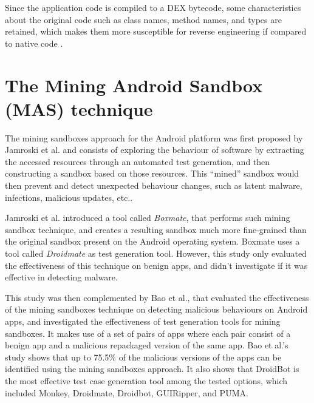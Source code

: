 Since the application code is compiled to a DEX bytecode, some characteristics about the original code such as class names, method names, and types are retained, which makes them more susceptible for reverse engineering if compared to native code \cite{hamilton_evaluation_2009}.

\section{The Mining Android Sandbox (MAS) technique}

The mining sandboxes approach for the Android platform was first proposed by Jamroski et al. and consists of exploring the behaviour of software by extracting the accessed resources through an automated test generation, and then constructing a sandbox based on those resources\cite{jamrozik_mining_2016}. This ``mined'' sandbox would then prevent and detect unexpected behaviour changes, such as latent malware, infections, malicious updates, etc..

Jamroski et al. introduced a tool called \textit{Boxmate}, that performs such mining sandbox technique, and creates a resulting sandbox much more fine-grained than the original sandbox present on the Android operating system. Boxmate uses a tool called \textit{Droidmate} as test generation tool. However, this study only evaluated the effectiveness of this technique on benign apps, and didn't investigate if it was effective in detecting malware.

This study was then complemented by Bao et al., that evaluated the effectiveness of the mining sandboxes technique on detecting malicious behaviours on Android apps, and investigated the effectiveness of test generation tools for mining sandboxes\cite{bao_mining_2018}. It makes use of a set of pairs of apps where each pair consist of a benign app and a malicious repackaged version of the same app. Bao et al.'s study shows that up to 75.5\% of the malicious versions of the apps can be identified using the mining sandboxes approach. It also shows that DroidBot\cite{li_droidbot_2017} is the most effective test case generation tool among the tested options, which included Monkey, Droidmate, Droidbot, GUIRipper, and PUMA.


